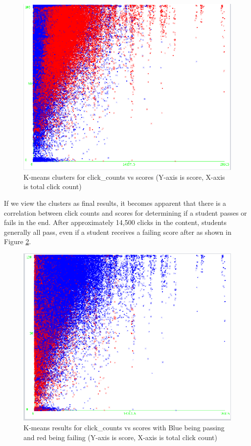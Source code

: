 \documentclass[12pt]{article}
\begin{document}
\begin{figure}[h]
 \centering
 \includegraphics[scale=0.35]{click_count_vs_score_clusters.png}
 \caption{K-means clusters for click\_counts vs scores (Y-axis is score, X-axis is total click count)}
 \label{fig:click_vs_score}
 \end{figure}
 
 If we view the clusters as final results, it becomes apparent that there is a correlation between click counts and scores for determining if a student passes or fails in the end. After approximately 14,500 clicks in the content, students generally all pass, even if a student receives a failing score after as shown in Figure \ref{fig:click_vs_score_f}. 

\begin{figure}[h]
 \centering
 \includegraphics[scale=0.35]{click_count_vs_score_finalresults.png}
 \caption{K-means results for click\_counts vs scores with Blue being passing and red being failing (Y-axis is score, X-axis is total click count)}
 \label{fig:click_vs_score_f}
 \end{figure}
\end{document}
